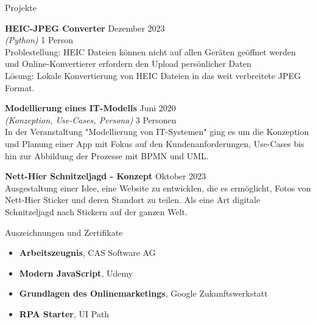 \documentclass{resume} %
\begin{document}
\begin{rSection}{Projekte}
    \newpage 
    \item \textbf{HEIC-JPEG Converter} \hfill {Dezember 2023}\\
    \textit{(Python)} \hfill {1 Person}\\
    {Problestellung: HEIC Dateien können nicht auf allen Geräten geöffnet werden und Online-Konvertierer erfordern den Upload persönlicher Daten \\
    Lösung: Lokale Konvertierung von HEIC Dateien in das weit verbreitete JPEG Format.}
    
    \item \textbf{Modellierung eines IT-Modells} \hfill {Juni 2020} \\
    \textit{(Konzeption, Use-Cases, Persona)} \hfill {3 Personen}\\ 
    {In der Veranstaltung "Modellierung von IT-Systemen" ging es um die Konzeption und Planung einer App mit Fokus auf den Kundenanforderungen, Use-Cases bis hin zur Abbildung der Prozesse mit BPMN und UML.}
    
    \item \textbf{Nett-Hier Schnitzeljagd - Konzept} \hfill {Oktober 2023} \\
    {Ausgestaltung einer Idee, eine Website zu entwicklen, die es ermöglicht, Fotos von Nett-Hier Sticker und deren Standort zu teilen. Als eine Art digitale Schnitzeljagd nach Stickern auf der ganzen Welt.}
\end{rSection}


\begin{rSection}{Auszeichnungen und Zertifikate}
    \begin{itemize}
        \item \textbf{Arbeitszeugnis}, CAS Software AG
        \item \textbf{Modern JavaScript}, Udemy
        \item \textbf{Grundlagen des Onlinemarketings}, Google Zukunftswerkstatt
        \item \textbf{RPA Starter}, UI Path
    \end{itemize}


\end{rSection}
\end{document}
